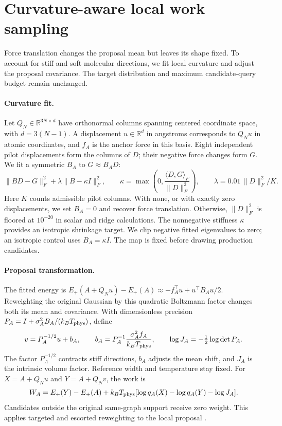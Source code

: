 \section{Curvature-aware local work sampling}\label{app:curvature-work}
Force translation changes the proposal mean but leaves its shape fixed. To account for stiff and soft molecular directions, we fit local curvature and adjust the proposal covariance. The target distribution and maximum candidate-query budget remain unchanged.

\paragraph{Curvature fit.}
Let $Q_N\in\mathbb R^{3N\times d}$ have orthonormal columns spanning centered coordinate space, with $d=3(N-1)$. A displacement $u\in\mathbb R^d$ in angstroms corresponds to $Q_Nu$ in atomic coordinates, and $f_A$ is the anchor force in this basis. Eight independent pilot displacements form the columns of $D$; their negative force changes form $G$. We fit a symmetric $B_A$ to $G\approx B_A D$:
\begin{equation}
 \|BD-G\|_F^2+\lambda\|B-\kappa I\|_F^2,
 \qquad
 \kappa=\max\!\left(0,\frac{\langle D,G\rangle_F}{\|D\|_F^2}\right),
 \qquad \lambda=0.01\,\|D\|_F^2/K.
\end{equation}
Here $K$ counts admissible pilot columns. With none, or with exactly zero displacements, we set $B_A=0$ and recover force translation. Otherwise, $\|D\|_F^2$ is floored at $10^{-20}$ in scalar and ridge calculations. The nonnegative stiffness $\kappa$ provides an isotropic shrinkage target. We clip negative fitted eigenvalues to zero; an isotropic control uses $B_A=\kappa I$. The map is fixed before drawing production candidates.

\paragraph{Proposal transformation.}
The fitted energy is $E_+(A+Q_Nu)-E_+(A)\approx-f_A^\top u+u^\top B_Au/2$. Reweighting the original Gaussian by this quadratic Boltzmann factor changes both its mean and covariance. With dimensionless precision $P_A=I+\sigma_A^2B_A/(k_B T_{\rm phys})$, define
\begin{equation}
 v=P_A^{-1/2}u+b_A,\qquad
 b_A=P_A^{-1}\frac{\sigma_A^2f_A}{k_B T_{\rm phys}},\qquad
 \log J_A=-\tfrac12\log\det P_A.
\end{equation}
The factor $P_A^{-1/2}$ contracts stiff directions, $b_A$ adjusts the mean shift, and $J_A$ is the intrinsic volume factor. Reference width and temperature stay fixed. For $X=A+Q_Nu$ and $Y=A+Q_Nv$, the work is
\begin{equation}
 W_A=E_+(Y)-E_+(A)+k_B T_{\rm phys}
 [\log q_A(X)-\log q_A(Y)-\log J_A].
\end{equation}
Candidates outside the original same-graph support receive zero weight. This applies targeted and escorted reweighting to the local proposal \citep{jarzynski2002targeted,escorted2008}.

